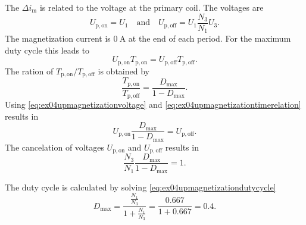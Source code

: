 \begin{solutionblock}
    The $\Delta i_\mathrm{m}$ is related to the voltage at the primary coil. The voltages are
    \begin{equation}
        U_\mathrm{p,on}=U_\mathrm{1}  \quad \text{and} \quad U_\mathrm{p,off}=U_\mathrm{1}\frac{N_\mathrm{3}}{N_\mathrm{1}} U_\mathrm{3}.
        \label{eq:ex04upmagnetizationvoltage}
    \end{equation}     
    The magnetization current is $\SI{0}{\ampere}$ at the end of each period. For the maximum duty cycle this leads to
    \begin{equation}
        U_\mathrm{p,on}T_\mathrm{p,on}=U_\mathrm{p,off}T_\mathrm{p,off}.
        \label{eq:ex04upmagnetizationtimerelation}        
    \end{equation} 
    The ration of $T_\mathrm{p,on}/T_\mathrm{p,off}$ is obtained by
    \begin{equation}
        \frac{T_\mathrm{p,on}}{T_\mathrm{p,off}}=\frac{D_\mathrm{max}}{1-D_\mathrm{max}}.
    \end{equation} 
    Using \eqref{eq:ex04upmagnetizationvoltage} and \eqref{eq:ex04upmagnetizationtimerelation} results in
    \begin{equation}
        U_\mathrm{p,on} \frac{D_\mathrm{max}}{1-D_\mathrm{max}} = U_\mathrm{p,off}.
        \label{eq:ex04upmagnetizationdutycycle}
    \end{equation}
    The cancelation of voltages $U_\mathrm{p,on}$ and $U_\mathrm{p,off}$ results in
    \begin{equation}
        \frac{N_\mathrm{3}}{N_\mathrm{1}} \frac{D_\mathrm{max}}{1-D_\mathrm{max}} = 1.
        \label{eq:ex04upmagnetizationdutycycle}
    \end{equation} 

    The duty cycle is calculated by solving \eqref{eq:ex04upmagnetizationdutycycle}
    \begin{equation}
        D_\mathrm{max}=\frac{\frac{N_\mathrm{1}}{N_\mathrm{3}}}{1+\frac{N_\mathrm{1}}{N_\mathrm{3}}} 
        = \frac{0.667}{1+0.667}=0.4.
    \end{equation}  
\end{solutionblock}

